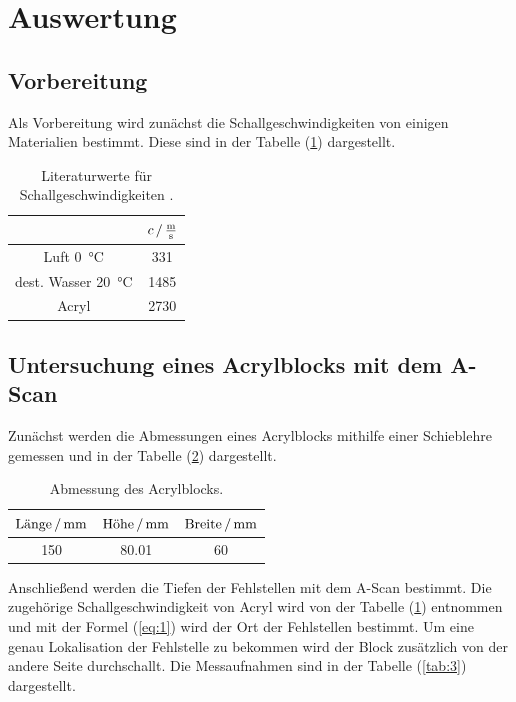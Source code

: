 \section{Auswertung}
\subsection{Vorbereitung}
Als Vorbereitung wird zunächst die Schallgeschwindigkeiten von einigen Materialien bestimmt. Diese sind in
der Tabelle (\ref{tab:1}) dargestellt.
\begin{table}[H]
  \centering
  \caption{Literaturwerte für Schallgeschwindigkeiten \cite{2} \cite{3}.}
  \label{tab:1}
  \begin{tabular}{c c}
    \toprule
     & $c \, / \, \si[per-mode=fraction]{\meter\per\second}$\\
     \midrule
     Luft \SI{0}{\celsius}          & 331  \\
     dest. Wasser \SI{20}{\celsius} & 1485 \\
     Acryl                          & 2730 \\
     \bottomrule
  \end{tabular}
\end{table}

\subsection{Untersuchung eines Acrylblocks mit dem A-Scan}
Zunächst werden die Abmessungen eines Acrylblocks mithilfe einer Schieblehre gemessen und in
der Tabelle (\ref{tab:2}) dargestellt.

\begin{table}[H]
  \centering
  \caption{Abmessung des Acrylblocks.}
  \label{tab:2}
  \begin{tabular}{c c c}
    \toprule
     $\text{Länge} \,/\, \si[per-mode=fraction]{\milli\meter}$ &$\text{Höhe} \, /\, \si[per-mode=fraction]{\milli\meter}$ &$\text{Breite} \, /\, \si[per-mode=fraction]{\milli\meter}$\\
     \midrule
     150 & 80.01 & 60 \\
     \bottomrule
  \end{tabular}
\end{table}

Anschließend werden die Tiefen der Fehlstellen mit dem A-Scan bestimmt. Die zugehörige Schallgeschwindigkeit
von Acryl wird von der Tabelle (\ref{tab:1}) entnommen und mit der Formel (\ref{eq:1}) wird der Ort der Fehlstellen bestimmt.
Um eine genau Lokalisation der Fehlstelle zu bekommen wird der Block zusätzlich von der andere Seite durchschallt.
Die Messaufnahmen sind in der Tabelle (\ref{tab:3}) dargestellt.


